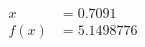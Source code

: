 \documentclass[preview]{standalone}
\begin{document}
\begin{align*}
x &= 0.7091\\f(x) &= 5.1498776
\end{align*}
\end{document}
